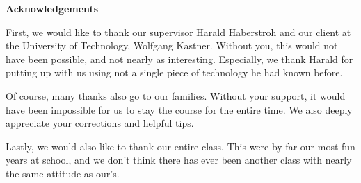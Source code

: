 \begin{flushleft}
	\Large
	\textbf{Acknowledgements\\}
	\vspace{1.5cm}

	\large
		First, we would like to thank our supervisor Harald Haberstroh and our client at the University of Technology, Wolfgang Kastner. Without you, this would not have been possible, and not nearly as interesting. Especially, we thank Harald for putting up with us using not a single piece of technology he had known before.

	Of course, many thanks also go to our families. Without your support, it would have been impossible for us to stay the course for the entire time. We also deeply appreciate your corrections and helpful tips.

	Lastly, we would also like to thank our entire class. This were by far our most fun years at school, and we don't think there has ever been another class with nearly the same attitude as our's.
\end{flushleft}
